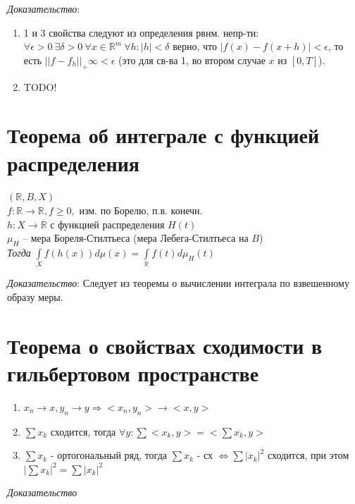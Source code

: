 \documentclass[paper=a4, fontsize=17pt]{article}
\begin{document}
\emph{Доказательство}: 

\begin{enumerate}
	\item 1 и 3 свойства следуют из определения рвнм. непр-ти: 
		$\forall \epsilon > 0 \ \exists \delta > 0 \  \forall x \in \mathbb{R}^m \ \forall h: |h| < \delta$ верно, что $|f(x) - f(x+h)| < \epsilon$, то есть $||f-f_h||_+\infty < \epsilon$
		(это для св-ва 1, во втором случае $x$ из $[0,T]$).
	\item TODO!
\end{enumerate}

\section{Теорема об интеграле с функцией распределения}
$(\mathbb{R}, B, X)$ \\
$f:\mathbb{R}\rightarrow\mathbb{R}, f \ge 0,$ изм. по Борелю, п.в. конечн.\\
$h: X \rightarrow \overline{\mathbb{R}}$ с функцией распределения $H(t)$\\ 


 

$\mu_H$ -- мера Бореля-Стилтьеса (мера Лебега-Стилтьеса на $B$)\\


\emph{Тогда} $\int\limits_X f(h(x))d\mu(x) = \int\limits_{\mathbb{R}}f(t)d\mu_{H}(t)$

\emph{Доказательство}: 
Следует из теоремы о вычислении интеграла по взвешенному образу меры.

\section{Теорема о свойствах сходимости в гильбертовом пространстве}
\begin{enumerate}
	\item $x_n \rightarrow x, y_n \rightarrow y \Rightarrow <x_n, y_n> \rightarrow <x, y>$
	
	\item $\sum x_k$ сходится, тогда $\forall y: \sum <x_k, y> = <\sum x_k, y>$
	
	\item $\sum x_k$ - ортогональный ряд, тогда $\sum x_k$ - сх $\Leftrightarrow \sum |x_k|^2$ сходится, при этом $|\sum x_k|^2 = \sum |x_k|^2$
	
\end{enumerate}

\emph{Доказательство}
\end{document}
